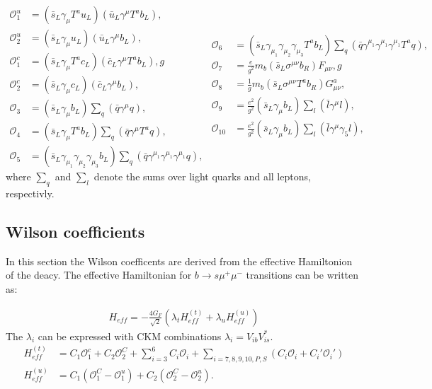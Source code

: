\documentclass[english]{uzhpub}
\begin{document}
\begin{equation}
 \begin{split}
  \mathcal{O}_1^u &= (\bar{s}_L \gamma_\mu T^a u_L)(\bar{u}_L \gamma^\mu T^a b_L),  \\
  \mathcal{O}_2^u &= (\bar{s}_L \gamma_\mu u_L) (\bar{u}_L \gamma^\mu b_L),  \\
  \mathcal{O}_1^c &= (\bar{s}_L \gamma_\mu T^a c_L) (\bar{c}_L \gamma^\mu T^a b_L), g \\
  \mathcal{O}_2^c &= (\bar{s}_L \gamma_\mu c_L) (\bar{c}_L \gamma^\mu b_L),  \\
  \mathcal{O}_3 &= (\bar{s}_L \gamma_\mu b_L) \sum_q (\bar{q} \gamma^\mu q),  \\
  \mathcal{O}_4 &= (\bar{s}_L \gamma_\mu T^a b_L) \sum_q (\bar{q} \gamma^\mu T^a q),  \\
  \mathcal{O}_5 &= (\bar{s}_L \gamma_{\mu_1} \gamma_{\mu_2} \gamma_{\mu_3} b_L ) \sum_q (\bar{q} \gamma^{\mu_1} \gamma^{\mu_1} \gamma^{\mu_1} q),
 \end{split}
 \begin{split}
  \mathcal{O}_6 &= (\bar{s}_L \gamma_{\mu_1} \gamma_{\mu_2} \gamma_{\mu_3} T^a b_L) \sum_q (\bar{q} \gamma^{\mu_1} \gamma^{\mu_1} \gamma^{\mu_1} T^a q), \\
  \mathcal{O}_7 &= \frac{e}{g^2} m_b (\bar{s}_L \sigma^{\mu \nu} b_R) F_{\mu \nu},g \\
  \mathcal{O}_8 &= \frac{1}{g} m_b (\bar{s}_L \sigma^{\mu \nu} T^a b_R) G_{\mu \nu}^a,  \\
  \mathcal{O}_9 &= \frac{e^2}{g^2} (\bar{s}_L \gamma_\mu b_L) \sum_l (\bar{l} \gamma^\mu l),  \\
  \mathcal{O}_{10} &= \frac{e^2}{g^2} (\bar{s}_L \gamma_\mu b_L) \sum_l (\bar{l} \gamma^\mu \gamma_5 l),
 \end{split}
 \label{eq:P}
\end{equation}
where $\sum_q$ and $\sum_l$ denote the sums over light quarks and all leptons, respectivly.




\subsection{Wilson coefficients}
In this section the Wilson coefficents are derived from the effective Hamiltonion of the deacy.
The effective Hamiltonian for $b \rightarrow s \mu^+ \mu^- $ transitions can be written as:

\begin{align}
 H_{eff} = - \frac{4 G_F}{\sqrt{2}} \left(\lambda_t H_{eff}^{(t)} + \lambda_u H_{eff}^{(u)} \right) \label{eq:H}
\end{align}
The $\lambda_i$ can be expressed with CKM combinations $\lambda_i = V_{ib}V_{is}^*$.
\begin{align}
 H_{eff}^{(t)} & = C_1 \mathcal{O}_1^c + C_2 \mathcal{O}_2^C + \sum_{i=3}^6 C_i \mathcal{O}_i + \sum_{i=7,8,9,10,P,S} (C_i \mathcal{O}_i + C_i' \mathcal{O}_i') \label{eq:H(t)} \\
 H_{eff}^{(u)} & = C_1 ( \mathcal{O}_1^C - \mathcal{O}_1^u) + C_2 (\mathcal{O}_2^C - \mathcal{O}_2^u). \label{eq:H(u)}
\end{align}
\end{document}
